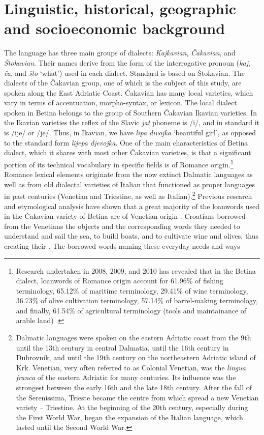 \documentclass[output=paper]{LSP/langsci}
\begin{document}
\section{Linguistic, historical, geographic and socioeconomic background}
The  language has three main groups of dialects: \textit{Kajkavian}, \textit{Čakavian}, and \textit{Štokavian}. Their names derive from the form of the interrogative pronoun (\textit{kaj}, \textit{ča}, and \textit{što} ‘what’) used in each dialect. Standard  is based on Štokavian. The dialects of the Čakavian group, one of which is the subject of this study, are spoken along the East Adriatic Coast. Čakavian has many local varieties, which vary in terms of accentuation, morpho-syntax, or lexicon. The local dialect spoken in Betina belongs to the group of Southern Čakavian Ikavian varieties. In the Ikavian varieties the reflex of the Slavic \textit{jat} phoneme is /i/, and in  standard  it is /ije/ or /je/. Thus, in Ikavian, we have \textit{lipa divojka} `beautiful girl', as opposed to the  standard form \textit{lijepa djevojka}. One of the main characteristics of Betina dialect, which it shares with most other Čakavian varieties, is that a significant portion of its technical vocabulary in specific fields is of Romance origin.\footnote{Research undertaken in 2008, 2009, and 2010 has revealed that in the Betina dialect, loanwords of Romance origin account for 61.96\% of fishing terminology, 65.12\% of maritime terminology, 29.41\% of wine terminology, 36.73\% of olive cultivation terminology, 57.14\% of barrel-making terminology, and finally, 61.54\% of agricultural terminology (tools and maintainance of arable land) \citep[254--255]{skevin_etimoloska_2010}.} Romance lexical elements originate from the now extinct Dalmatic languages as well as from old dialectal varieties of Italian that functioned as proper languages in past centuries (Venetian and Triestine, as well as Italian).\footnote{ Dalmatic languages were spoken on the eastern Adriatic coast from the 9th until the 13th century in central Dalmatia, until the 16th century in Dubrovnik, and until the 19th century on the northeastern Adriatic island of Krk. Venetian, very often referred to as Colonial Venetian, was the \textit{lingua franca }of the eastern Adriatic for many centuries. Its influence was the strongest between the early 16th and the late 18th century. After the fall of the Serenissima, Trieste became the centre from which spread a new Venetian variety – Triestine. At the beginning of the 20th century, especially during the First World War, began the expansion of the Italian language, which lasted until the Second World War.} Previous research and etymological analysis have shown that a great majority of the loanwords used in the Čakavian variety of Betina are of Venetian origin \citep{filipi_betinska_1997,skevin_etimoloska_2010}. Croatians borrowed from the Venetians the objects and the corresponding words they needed to understand and sail the sea, to build boats, and to cultivate wine and olives, thus creating their . The borrowed words naming these everyday needs and ways 
\end{document}
